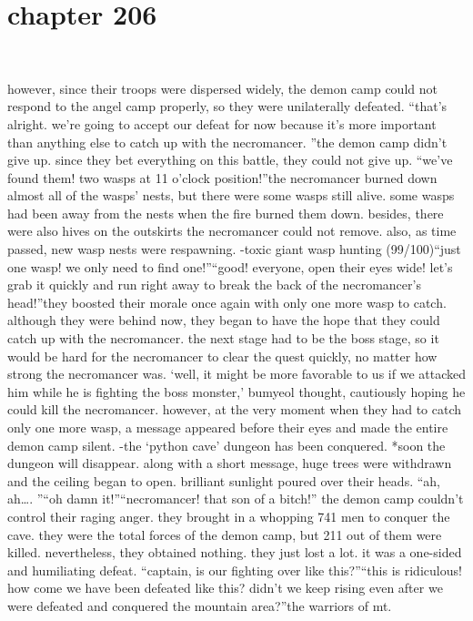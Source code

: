 \section{chapter 206}

                             




however, since their troops were dispersed widely, the demon camp could not respond to the angel camp properly, so they were unilaterally defeated.
“that’s alright.
 we’re going to accept our defeat for now because it’s more important than anything else to catch up with the necromancer.
”the demon camp didn’t give up.
 since they bet everything on this battle, they could not give up.
“we’ve found them! two wasps at 11 o’clock position!”the necromancer burned down almost all of the wasps’ nests, but there were some wasps still alive.
 some wasps had been away from the nests when the fire burned them down.
 besides, there were also hives on the outskirts the necromancer could not remove.
 also, as time passed, new wasp nests were respawning.
-toxic giant wasp hunting (99/100)“just one wasp! we only need to find one!”“good! everyone, open their eyes wide! let’s grab it quickly and run right away to break the back of the necromancer’s head!”they boosted their morale once again with only one more wasp to catch.
 although they were behind now, they began to have the hope that they could catch up with the necromancer.
the next stage had to be the boss stage, so it would be hard for the necromancer to clear the quest quickly, no matter how strong the necromancer was.
‘well, it might be more favorable to us if we attacked him while he is fighting the boss monster,’ bumyeol thought, cautiously hoping he could kill the necromancer.
however, at the very moment when they had to catch only one more wasp, a message appeared before their eyes and made the entire demon camp silent.
-the ‘python cave’ dungeon has been conquered.
*soon the dungeon will disappear.
along with a short message, huge trees were withdrawn and the ceiling began to open.
brilliant sunlight poured over their heads.
“ah, ah….
”“oh damn it!”“necromancer! that son of a bitch!”
the demon camp couldn’t control their raging anger.
they brought in a whopping 741 men to conquer the cave.
 they were the total forces of the demon camp, but 211 out of them were killed.
nevertheless, they obtained nothing.
 they just lost a lot.
 it was a one-sided and humiliating defeat.
“captain, is our fighting over like this?”“this is ridiculous! how come we have been defeated like this? didn’t we keep rising even after we were defeated and conquered the mountain area?”the warriors of mt.
